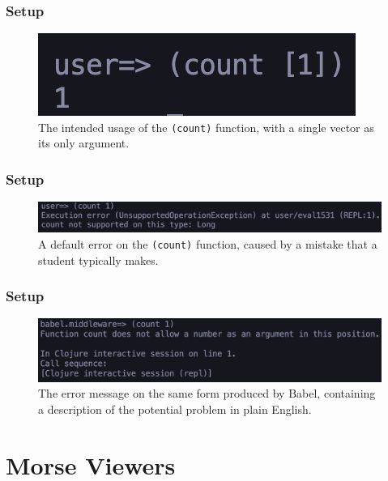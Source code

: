 \documentclass{beamer}
\begin{document}
\begin{frame}
    \frametitle{Setup}
    \begin{figure}
        \centering
        \includegraphics[width=\textwidth]{../resources/CountIntendedUse.png}
        \caption{The intended usage of the \texttt{(count)} function, with a single vector as its only argument.}
        \label{fig:intendeduse}
    \end{figure}
\end{frame}

\begin{frame}
    \frametitle{Setup}
    \begin{figure}
        \centering
        \includegraphics[width=\textwidth]{../resources/CountError.png}
        \caption{A default error on the \texttt{(count)} function, caused by a mistake that a student typically makes.}
        \label{fig:countError}
    \end{figure}
\end{frame}

\begin{frame}
    \frametitle{Setup}
    \begin{figure}
        \centering
        \includegraphics[width=\textwidth]{../resources/CountBabelError.png}
        \caption{The error message on the same form produced by Babel, containing a description of the potential problem in plain English.}
        \label{fig:BabelCountError}
    \end{figure}
\end{frame}

\section{Morse Viewers}
\end{document}
